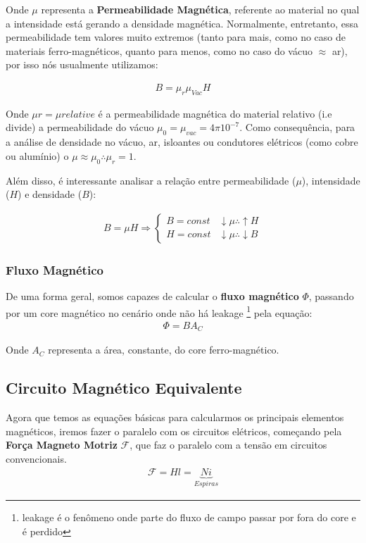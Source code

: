 \documentclass{article}
\begin{document}
Onde $\mu$ representa a \textbf{Permeabilidade Magnética}, referente ao material no qual a intensidade está gerando a densidade magnética. Normalmente, entretanto, essa permeabilidade tem valores muito extremos (tanto para mais, como no caso de materiais ferro-magnéticos, quanto para menos, como no caso do vácuo $\approx$ ar), por isso nós usualmente utilizamos:

\begin{align}
    B = \mu_{r} \mu_{Vac} H
\end{align}

Onde $\mu{r} = \mu{relative}$ é a permeabilidade magnética do material relativo (i.e divide) a permeabilidade do vácuo $\mu_{0} = \mu_{vac} = 4\pi 10^{-7}$. Como consequência, para a análise de densidade no vácuo, ar, isloantes ou condutores elétricos (como cobre ou alumínio) o $\mu \approx \mu_0 \therefore \mu_r = 1$.

Além disso, é interessante analisar a relação entre permeabilidade ($\mu$), intensidade ($H$) e densidade ($B$):

\begin{align*}
    B = \mu H \Rightarrow \begin{cases}
        B = const & \downarrow \mu \therefore \uparrow H \\ 
        H = const & \downarrow \mu \therefore \downarrow B
    \end{cases}
\end{align*}

\subsubsection{Fluxo Magnético}

De uma forma geral, somos capazes de calcular o \textbf{fluxo magnético} $\Phi$, passando por um core magnético no cenário onde não há leakage \footnote{leakage é o fenômeno onde parte do fluxo de campo passar por fora do core e é perdido} pela equação:
\begin{align}
    \Phi = B A_C
\end{align}

Onde $A_C$ representa a área, constante, do core ferro-magnético.


\subsection{Circuito Magnético Equivalente}
Agora que temos as equações básicas para calcularmos os principais elementos magnéticos, iremos fazer o paralelo com os circuitos elétricos, começando pela  \textbf{Força Magneto Motriz} $\mathcal{F}$, que faz o paralelo com a tensão em circuitos convencionais.
\begin{align}
    \mathcal{F} = Hl = \underbrace{Ni}_{Espiras}
\end{align}
\end{document}
